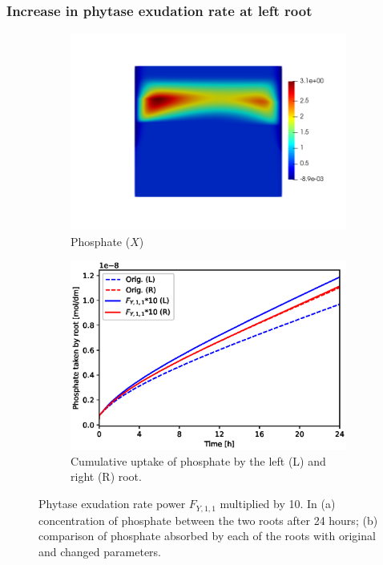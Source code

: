 \documentclass[11pt]{article}
\begin{document}
\FloatBarrier
\subsubsection{Increase in phytase exudation rate at left root}
\begin{figure}[!htb]
\centering
\begin{subfigure}[t]{0.45\textwidth}
    \includegraphics[trim= 100 100 60 100,width=\textwidth]{Figures/X_Fy11times10.png}
    \caption{Phosphate ($X$)}
\end{subfigure}
\qquad
\begin{subfigure}[t]{0.45\textwidth}
    \includegraphics[width=\textwidth]{Figures/Fy11times10.eps}
    \caption{Cumulative uptake of phosphate by the left (L) and right (R) root.}
\end{subfigure}

\caption{Phytase exudation rate power $F_{Y,1,1}$ multiplied by 10. In (a) concentration of phosphate between the two roots after 24 hours; (b) comparison of phosphate absorbed by each of the roots with original and changed parameters.}
\end{figure}
\end{document}
